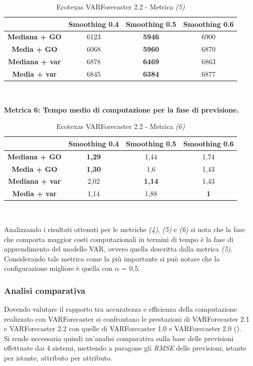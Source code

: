 \documentclass[12pt,a4paper,oneside,openright]{book}
\begin{document}
\begin{table}[H]
\centering
\begin{tabular}[H]{|c|c|c|c|}
\hline
& Smoothing 0.4 & Smoothing 0.5 & Smoothing 0.6\\
\hline
\textbf{Mediana + GO} & 6123 & \textbf{5946} & 6900\\ 
\hline
\textbf{Media + GO} & 6068 & \textbf{5960} & 6870\\ 
\hline
\textbf{Mediana + var} & 6878 & \textbf{6469} & 6863\\ 
\hline
\textbf{Media + var} & 6845 & \textbf{6384} & 6877\\ 
\hline
\end{tabular} \\
\caption{Ecotexas VARForecaster 2.2 - Metrica \textit{(5)}}
\end{table}

\medskip 
\textbf{Metrica 6: Tempo medio di computazione per la fase di previsione.}

\medskip

\begin{table}[H]
\centering
\begin{tabular}[H]{|c|c|c|c|}
\hline
& Smoothing 0.4 & Smoothing 0.5 & Smoothing 0.6\\
\hline
\textbf{Mediana + GO} & \textbf{1,29} & 1,44 & 1,74\\ 
\hline
\textbf{Media + GO} & \textbf{1,30} & 1,6 & 1,43\\ 
\hline
\textbf{Mediana + var} & 2,02 & \textbf{1,14} & 1,43\\ 
\hline
\textbf{Media + var} & 1,14 & 1,88 & \textbf{1}\\ 
\hline
\end{tabular} \\
\caption{Ecotexas VARForecaster 2.2 - Metrica \textit{(6)}}
\end{table}

Analizzando i risultati ottenuti per le metriche \textit{(4)}, \textit{(5)} e \textit{(6)} si nota che la fase che comporta maggior costi computazionali in termini di tempo è la fase di apprendimento del modello VAR, ovvero quella descritta dalla metrica \textit{(5)}. Considerando tale metrica come la più importante si può notare che la configurazione migliore è quella con $\alpha$ = 0,5.

\newpage
\subsubsection{Analisi comparativa}
Dovendo valutare il rapporto tra accuratezza e efficienza della computazione realizzato con VARForecaster si confrontano le prestazioni di VARForecaster 2.1 e VARForecaster 2.2 con quelle di VARForecaster 1.0 e VARForecaster 2.0 (\cite{donato}). \\
Si rende necessaria quindi un'analisi comparativa sulla base delle previsioni effettuate dai 4 sistemi, mettendo a paragone gli \textit{RMSE} delle previsioni, istante per istante, attributo per attributo.
\end{document}

